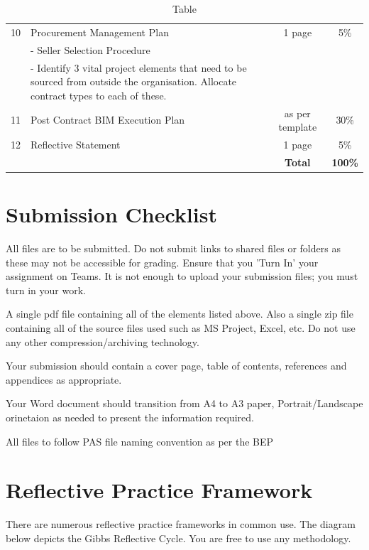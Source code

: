 \begin{table}[ht]
\begin{tabular}{|c|l|c|c|}
		10  & Procurement Management Plan &  1 page  & 5\% \\
   			&	- Seller Selection Procedure  & & \\
   			&	- Identify 3 vital project elements that need to be sourced from outside the organisation.  Allocate contract types to each of these.  & & \\
		\hline

		11  & Post Contract BIM Execution Plan &  as per template  & 30\% \\
		\hline
		12  & Reflective Statement &  1 page  & 5\% \\
		
		
		\hline
		\hline
        & & \textbf{Total} & \textbf{100\%} \\
		\hline
	
	\end{tabular}
	\caption{Table }
	\label{tab:AM}
\end{table}



\newpage
\section*{Submission Checklist}

All files are to be submitted.  Do not submit links to shared files or folders as these may not be accessible for grading.  Ensure that you 'Turn In' your assignment on Teams.  It is not enough to upload your submission files; you must turn in your work.

A single pdf file containing all of the elements listed above.  Also a single zip file containing all of the source files used such as MS Project, Excel, etc.
Do not use any other compression/archiving technology.

Your submission should contain a cover page, table of contents, references and appendices as appropriate.

Your Word document should transition from A4 to A3 paper, Portrait/Landscape orinetaion as needed to present the information required.

All files to follow PAS file naming convention as per the BEP

\newpage
\section*{Reflective Practice Framework}

There are numerous reflective practice frameworks in common use.  The diagram below depicts the Gibbs Reflective Cycle.  You are free to use any methodology.


